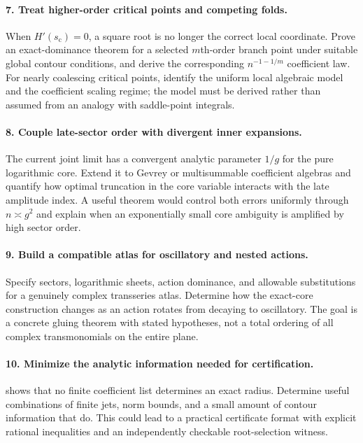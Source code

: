 \documentclass[11pt,a4paper]{article}
\numberwithin{equation}{section}
\theoremstyle{definition}
\theoremstyle{remark}
\begin{document}
\paragraph{7. Treat higher-order critical points and competing folds.}
When $H'(s_{\mathrm c})=0$, a square root is no longer the correct local coordinate. Prove an exact-dominance theorem for a selected $m$th-order branch point under suitable global contour conditions, and derive the corresponding $n^{-1-1/m}$ coefficient law. For nearly coalescing critical points, identify the uniform local algebraic model and the coefficient scaling regime; the model must be derived rather than assumed from an analogy with saddle-point integrals.

\paragraph{8. Couple late-sector order with divergent inner expansions.}
The current joint limit has a convergent analytic parameter $1/g$ for the pure logarithmic core. Extend it to Gevrey or multisummable coefficient algebras and quantify how optimal truncation in the core variable interacts with the late amplitude index. A useful theorem would control both errors uniformly through $n\asymp g^2$ and explain when an exponentially small core ambiguity is amplified by high sector order.

\paragraph{9. Build a compatible atlas for oscillatory and nested actions.}
Specify sectors, logarithmic sheets, action dominance, and allowable substitutions for a genuinely complex transseries atlas. Determine how the exact-core construction changes as an action rotates from decaying to oscillatory. The goal is a concrete gluing theorem with stated hypotheses, not a total ordering of all complex transmonomials on the entire plane.

\paragraph{10. Minimize the analytic information needed for certification.}
 shows that no finite coefficient list determines an exact radius. Determine useful combinations of finite jets, norm bounds, and a small amount of contour information that do. This could lead to a practical certificate format with explicit rational inequalities and an independently checkable root-selection witness.
\end{document}
